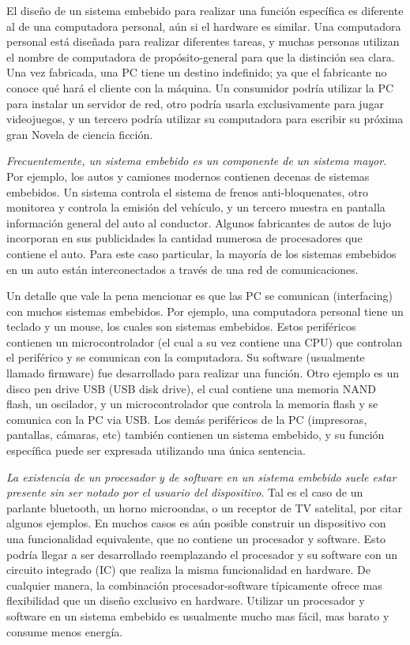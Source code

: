 \documentclass[output=paper, 
colorlinks,
citecolor=brown,
newtxmath
]{langscibook}
\begin{document}
El diseño de un sistema embebido para realizar una función específica es diferente al de una
computadora personal, aún si el hardware es similar. Una computadora personal está diseñada
para realizar diferentes tareas, y muchas personas utilizan el nombre de computadora de propósito-general
para que la distinción sea clara. Una vez fabricada, una PC tiene un destino indefinido; 
ya que el fabricante no conoce qué hará el cliente con la máquina. Un consumidor podría utilizar
la PC para instalar un servidor de red, otro podría usarla exclusivamente para jugar videojuegos,
y un tercero podría utilizar su computadora para escribir su próxima gran Novela de ciencia ficción.


\textit{Frecuentemente, un sistema embebido es un componente de un sistema mayor}. Por ejemplo, 
los autos y camiones modernos contienen decenas de sistemas embebidos. Un sistema controla el sistema de frenos anti-bloquenates, otro monitorea y controla la emisión del vehículo, 
y un tercero muestra en pantalla información general del auto al conductor.  Algunos fabricantes de
autos de lujo incorporan en sus publicidades la cantidad numerosa de procesadores que contiene
el auto. Para este caso particular, la mayoría de los sistemas embebidos en un auto
están interconectados a través de una red de comunicaciones.



Un detalle que vale la pena mencionar es que las PC se comunican (interfacing) con 
muchos sistemas embebidos. Por ejemplo, una computadora personal tiene un teclado y un mouse,
los cuales son sistemas embebidos. Estos periféricos contienen un microcontrolador (el cual
a su vez contiene una CPU) que controlan el periférico y se comunican con la computadora.
Su software (usualmente llamado firmware) fue desarrollado para realizar una función.
Otro ejemplo es un disco pen drive USB (USB disk drive), el cual contiene una memoria NAND flash,
un oscilador, y un microcontrolador que controla la memoria flash y se comunica con la PC
via USB. Los demás periféricos de la PC (impresoras, pantallas, cámaras, etc) también
contienen un sistema embebido, y su función específica puede ser expresada utilizando
una única sentencia.

\textit{La existencia de un procesador y de software en un sistema embebido suele estar presente sin
ser notado por el usuario del dispositivo}. Tal es el caso de un parlante bluetooth, un horno microondas,
o un receptor de TV satelital, por citar algunos ejemplos. En muchos casos es aún posible construir
un dispositivo con una funcionalidad equivalente, que no contiene un procesador y software. 
Esto podría llegar a ser desarrollado reemplazando el procesador y su software con un circuito integrado
(IC) que realiza la misma funcionalidad en hardware. De cualquier manera, la combinación
procesador-software típicamente ofrece mas flexibilidad que un diseño exclusivo en hardware. 
Utilizar un procesador y software en un sistema embebido es usualmente mucho mas fácil, mas barato y 
consume menos energía.
\end{document}
